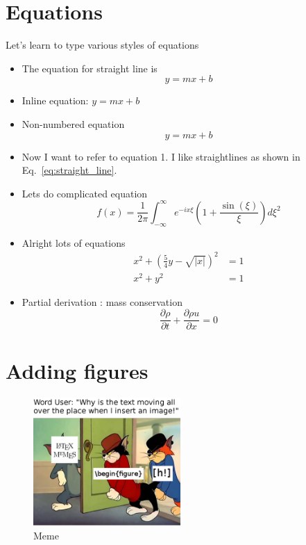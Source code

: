 \documentclass[12pt,a4paper]{article}
\begin{document}
\section{Equations}
Let's learn to type various styles of equations
\begin{itemize}
    \item The equation for straight line is 
    \begin{equation}
        y=mx+b
        \label{eq:straight_line}
    \end{equation}
    \item Inline equation: $y=mx+b$
    \item Non-numbered equation
    \begin{equation*}
        y=mx+b
    \end{equation*}
    \item Now I want to refer to equation 1. I like straightlines as shown in Eq.~\ref{eq:straight_line}.

    \item Lets do complicated equation
    \begin{equation}
        f(x)=\frac{1}{2\pi}\int_{-\infty}^{\infty} e^{-ix\xi}\left(1+\frac{\sin(\xi)}{\xi}\right) d\xi^2
    \end{equation}

    \item Alright lots of equations
    \begin{align}
        x^2+\left(\frac{5}{4} y-\sqrt{|x|} \right)^2 &= 1\\ %
        x^2+y^2 &= 1 %
    \end{align}

    \item Partial derivation : mass conservation
    \begin{equation}
        \frac{\partial \rho}{\partial t }+\frac{\partial \rho u}{\partial x}=0
    \end{equation}
    
    
\end{itemize}

\section{Adding figures}
\begin{figure} %
    \centering
    \includegraphics[width=0.5\textwidth]{figures/beginfigurememe.png}
    \caption{Meme}
    \label{fig:meme_figure}
\end{figure}
\end{document}
